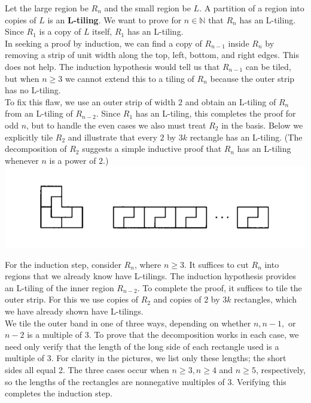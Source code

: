 \documentclass[a4paper, 11pt, twoside]{article}
\begin{document}
Let the large region be $R_n$ and the small region be $L$. A partition of a region into copies of $L$ is an \textbf{L-tiling}. We want to prove for $n\in\mathbb{N}$ that $R_n$ has an L-tiling. Since $R_1$ is a copy of $L$ itself, $R_1$ has an L-tiling.\\

In seeking a proof by induction, we can find a copy of $R_{n-1}$ inside $R_n$ by removing  a strip of unit width along the top, left, bottom, and right edges. This does not help. The induction hypothesis would tell us that  $R_{n-1}$ can be tiled, but when $n\geq 3$ we cannot extend this to a tiling of $R_n$ because the outer strip has no L-tiling.\\

To fix this flaw, we use an outer strip of width $2$ and obtain an L-tiling of $R_n$ from an L-tiling of $R_{n-2}$. Since $R_1$ has an L-tiling, this completes the proof for odd $n$, but to handle the even cases we also must treat $R_2$ in the basis. Below we explicitly tile $R_2$ and illustrate that every $2$ by $3k$ rectangle has an L-tiling. (The decomposition of $R_2$ suggests a simple inductive proof that $R_n$ has an L-tiling whenever $n$ is a power of $2$.)\\

\includegraphics[width=\linewidth]{images/L2}

For the induction step, consider $R_n$, where $n\geq 3$. It suffices to cut $R_n$ into regions that we already know have L-tilings. The induction hypothesis provides an L-tiling of the inner region $R_{n-2}$. To complete the proof, it suffices to tile the outer strip. For this we use copies of $R_2$ and copies of $2$ by $3k$ rectangles, which we have already shown have L-tilings.\\

We tile the outer band in one of three ways, depending on whether $n, n-1,$ or $n-2$ is a multiple of $3$. To prove that the decomposition works in each case, we need only verify that the length of the long side of each rectangle used is a multiple of $3$. For clarity in the pictures, we list only these lengths; the short sides all equal 2. The three cases occur when $n\geq 3, n \geq 4$ and $n\geq 5$, respectively, so the lengths of the rectangles are nonnegative multiples of $3$. Verifying this completes the induction step.
\end{document}
